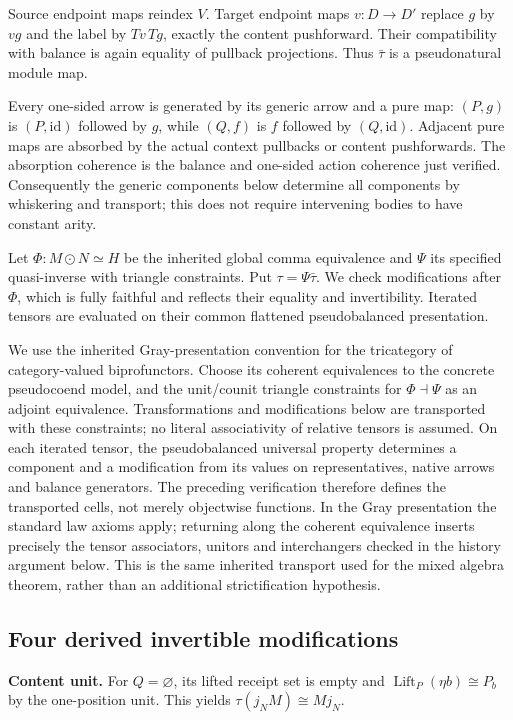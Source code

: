 \documentclass[11pt,a4paper]{article}
\theoremstyle{definition}
\newcommand{\id}{\mathrm{id}}
\begin{document}
Source endpoint maps reindex $V$. Target endpoint maps $v:D\to D'$
replace $g$ by $vg$ and the label by $Tv\,Tg$, exactly the content
pushforward. Their compatibility with balance is again equality of
pullback projections. Thus $\bar\tau$ is a pseudonatural module map.

Every one-sided arrow is generated by its generic arrow and a pure map:
$(P,g)$ is $(P,\id)$ followed by $g$, while $(Q,f)$ is $f$ followed by
$(Q,\id)$. Adjacent pure maps are absorbed by the actual context pullbacks
or content pushforwards. The absorption coherence is the balance and
one-sided action coherence just verified. Consequently the generic
components below determine all components by whiskering and transport;
this does not require intervening bodies to have constant arity.

Let $\Phi:M\odot N\simeq H$ be the inherited global comma equivalence
and $\Psi$ its specified quasi-inverse with triangle constraints. Put
$\tau=\Psi\bar\tau$. We check modifications after $\Phi$, which is
fully faithful and reflects their equality and invertibility. Iterated
tensors are evaluated on their common flattened pseudobalanced presentation.

We use the inherited Gray-presentation convention for the tricategory of
category-valued biprofunctors. Choose its coherent equivalences to the
concrete pseudocoend model, and the unit/counit triangle constraints for
$\Phi\dashv\Psi$ as an adjoint equivalence. Transformations and
modifications below are transported with these constraints; no literal
associativity of relative tensors is assumed. On each iterated tensor, the
pseudobalanced universal property determines a component and a modification
from its values on representatives, native arrows and balance generators.
The preceding verification therefore defines the transported cells, not
merely objectwise functions. In the Gray presentation the standard law
axioms apply; returning along the coherent equivalence inserts precisely
the tensor associators, unitors and interchangers checked in the history
argument below. This is the same inherited transport used for the mixed
algebra theorem, rather than an additional strictification hypothesis.

\subsection{Four derived invertible modifications}

\textbf{Content unit.} For $Q=\varnothing$, its lifted receipt set is empty
and $\operatorname{Lift}_P(\eta b)\cong P_b$ by the one-position unit.
This yields $\tau(j_NM)\cong Mj_N$.
\end{document}
